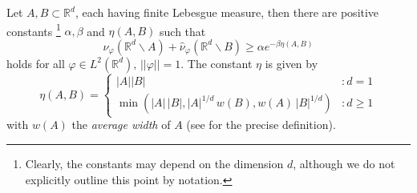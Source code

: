 \documentclass[12pt,a4paper,draft]{article}
\newcommand{\RR}[1]{\mathbb{R}^#1}
\begin{document}
Let $A,B\subset {\RR d}$, each having finite Lebesgue measure, then there are
positive constants \footnote{Clearly, the constants may depend on the dimension 
$d$, although we do not explicitly outline this point by notation.}
$\alpha,\beta$ and $\eta(A,B)$ such that
\begin{equation}\label{JamingNazarov}
     \nu_{\varphi}({\RR d}\backslash A)+
     \hat\nu_{\varphi}({\RR d}\backslash B) \geq \alpha e^{-\beta \eta(A,B)}
\end{equation}
holds  for all $\varphi\in L^2(\RR d),\,||\varphi||=1$. The constant $\eta$
is given by
\begin{displaymath}
    \eta(A,B) = \left\{ \begin{array}{lr} |A| |B| & : d = 1
     \\ \min(|A|\,|B|,|A|^{1/d}\, w(B), w(A)\, |B|^{1/d}) & : d \ge 1 
     \end{array} \right.
\end{displaymath}
with $w(A)$ the {\sl average width} of $A$ (see \cite{jaming:hal-00120268} 
for the precise definition).
\end{document}
